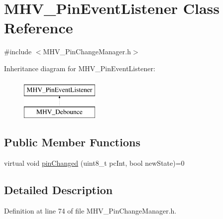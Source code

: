 \hypertarget{class_m_h_v___pin_event_listener}{
\section{\-M\-H\-V\-\_\-\-Pin\-Event\-Listener \-Class \-Reference}
\label{class_m_h_v___pin_event_listener}
}


{\ttfamily \#include $<$\-M\-H\-V\-\_\-\-Pin\-Change\-Manager.\-h$>$}

\-Inheritance diagram for \-M\-H\-V\-\_\-\-Pin\-Event\-Listener\-:\begin{figure}[H]
\begin{center}
\leavevmode
\includegraphics[height=2.000000cm]{class_m_h_v___pin_event_listener}
\end{center}
\end{figure}
\subsection*{\-Public \-Member \-Functions}
\begin{DoxyCompactItemize}
\item 
virtual void \hyperlink{class_m_h_v___pin_event_listener_a9d4aa051525f2c6a30b104820663d364}{pin\-Changed} (uint8\-\_\-t pc\-Int, bool new\-State)=0
\end{DoxyCompactItemize}


\subsection{\-Detailed \-Description}


\-Definition at line 74 of file \-M\-H\-V\-\_\-\-Pin\-Change\-Manager.\-h.




